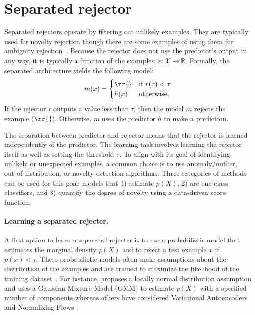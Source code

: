 \section{Separated rejector}\label{sec:separated_rejector}

Separated rejectors operate by filtering out unlikely examples. They are typically used for novelty rejection though there are some examples of using them for ambiguity rejection~\citep{Asif2020}. 
Because the rejector does not use the predictor's output in any way, it is typically a function of the examples: $r \colon \mathcal{X} \to \mathbb{R}$. Formally, the separated architecture yields the following model:
\begin{equation}
m(x) = 
\begin{cases}
\rr{} & \text{if } r(x) < \tau \\
h(x)	  & \text{otherwise.}
\end{cases}
\label{eq:separated_rejector}
\end{equation}
If the rejector $r$ outputs a value less than $\tau$, then the model $m$ rejects the example ($\rr{}$). Otherwise, $m$ uses the predictor $h$ to make a prediction.  

The separation between predictor and rejector means that the rejector is learned independently of the predictor. The learning task involves learning the rejector itself as well as setting the threshold $\tau$. To align with its goal of identifying unlikely or unexpected examples, a common choice is to use anomaly/outlier, out-of-distribution, or novelty detection algorithms. Three categories of methods can be used for this goal: models that 1) estimate $p(X)$, 2) are one-class classifiers, and 3) quantify the degree of novelty using a data-driven score function.

\paragraph{\textbf{Learning a separated rejector.}} 
A first option to learn a separated rejector is to use a probabilistic model that estimates the marginal density $p(X)$ and to reject a test example $x$ if $p(x)<\tau$. These probabilistic models often make assumptions about the distribution of the examples and are trained to maximize the likelihood of the training dataset~\citep{Vasconcelos1993}. For instance, \citet{Landgrebe2004} proposes a locally normal distribution assumption and uses a Gaussian Mixture Model (GMM) to estimate $p(X)$ with a specified number of components whereas others have considered Variational Autoencoders~\citep{Wang2020} and Normalizing Flows~\citep{Nalisnick2019}.

